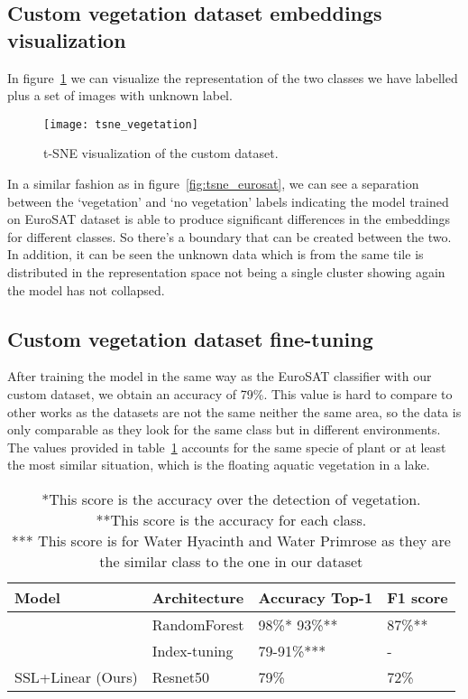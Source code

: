 \documentclass[conference]{IEEEtran}
\begin{document}
    \subsection{Custom vegetation dataset embeddings visualization}
    In figure~\ref{fig:tsne_vegetation} we can visualize the representation of the two classes we have labelled plus a set of images
    with unknown label.

    \begin{figure}[h]
        \centering
        \texttt{[image: tsne\_vegetation]}
        \caption{t-SNE visualization of the custom dataset.}
        \label{fig:tsne_vegetation}
    \end{figure}

    In a similar fashion as in figure~\ref{fig:tsne_eurosat}, we can see a separation between the `vegetation' and `no vegetation' labels
    indicating the model trained on EuroSAT dataset is able to produce significant differences in the embeddings for different classes.
    So there's a boundary that can be created between the two.
    In addition, it can be seen the unknown data which is from the same tile is distributed in the representation space not being a single cluster
    showing again the model has not collapsed.

    \subsection{Custom vegetation dataset fine-tuning}
    After training the model in the same way as the EuroSAT classifier with our custom dataset, we obtain an accuracy of 79\%.
    This value is hard to compare to other works as the datasets are not the same neither the same area, so the data is only comparable as they look for the same
    class but in different environments.
    The values provided in table~\ref{table:vegetation_results} accounts for the same specie of plant or at least the most similar situation,
    which is the floating aquatic vegetation in a lake.
    \begin{table}[h!]
        \centering
        \begin{tabular}{ |p{2cm}||p{1.5cm}|p{2.2cm}|p{1.3cm}|}
            \hline
            Model              & Architecture & Accuracy Top-1 & F1 score \\
            \hline
            \hline
            \citet{rs12244021} & RandomForest & 98\%* 93\%**   & 87\%**   \\
            \citet{rs14133013} & Index-tuning & 79-91\%***     & -        \\
            SSL+Linear (Ours)  & Resnet50     & 79\%           & 72\%     \\
            \hline
        \end{tabular}
        \caption{
            *This score is the accuracy over the detection of vegetation. \\
            **This score is the accuracy for each class. \\
            *** This score is for Water Hyacinth and Water Primrose as they are the similar class to the one in our dataset}
        \label{table:vegetation_results}
    \end{table}
\end{document}
